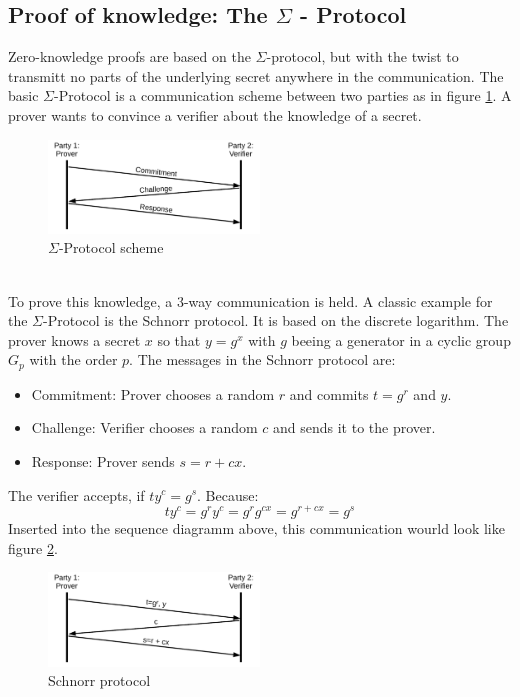 \documentclass[]{article}
\begin{document}
\subsection{Proof of knowledge: The $\Sigma$ - Protocol}
Zero-knowledge proofs are based on the $\Sigma$-protocol, but with the twist to transmitt no parts of the underlying secret anywhere in the communication. The basic $\Sigma$-Protocol is a communication scheme between two parties as in figure \ref{fig:sigma}. A prover wants to convince a verifier about the knowledge of a secret. 
\begin{figure}[htbp]
\center
\includegraphics[width=0.5\textwidth]{pics/sigma.pdf}
\caption{$\Sigma$-Protocol scheme}
\label{fig:sigma}
\end{figure}\\
To prove this knowledge, a 3-way communication is held. A classic example for the $\Sigma$-Protocol is the Schnorr protocol. It is based on the discrete logarithm. The prover knows a secret $x$ so that $y=g^{x}$ with $g$ beeing a generator in a cyclic group $G_{p}$ with the order $p$. The messages in the Schnorr protocol are:
\begin{itemize}
\item{Commitment: Prover chooses a random $r$ and commits $t = g^{r}$ and $y$.}
\item{Challenge: Verifier chooses a random $c$ and sends it to the prover.}
\item{Response: Prover sends $s = r + cx$.}
\end{itemize}
The verifier accepts, if $ty^{c} = g^{s}$. Because:
\[ty^{c} = g^{r}y^{c} = g^{r}g^{cx} = g^{r + cx} = g^{s}\]
Inserted into the sequence diagramm above, this communication wourld look like figure \ref{fig:schnorr}.
\begin{figure}[htbp]
\center
\includegraphics[width=0.5\textwidth]{pics/schnorr.pdf}
\caption{Schnorr protocol}
\label{fig:schnorr}
\end{figure}\\
\end{document}
